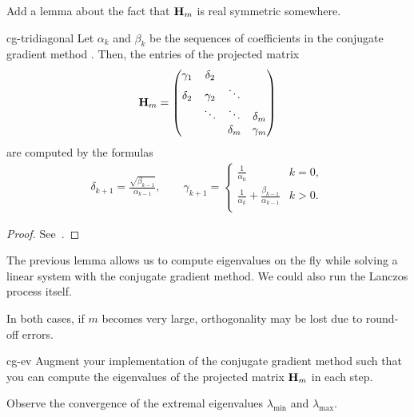 \begin{todo}
  Add a lemma about the fact that $\mathbf H_m$ is real symmetric somewhere.
\end{todo}

\begin{Lemma}{cg-tridiagonal}
  Let $\alpha_k$ and $\beta_k$ be the sequences of coefficients in the conjugate gradient method
  . Then, the entries of the projected matrix
  \begin{gather}
    \mathbf H_m =
    \begin{pmatrix}
            \gamma_1 & \delta_2\\
      \delta_2 & \gamma_2 & \ddots\\
      &\ddots&\ddots&\delta_m\\
      &&\delta_{m}&\gamma_m
    \end{pmatrix}
  \end{gather}
  are computed by the formulas
  \begin{gather}
    \delta_{k+1} = \frac{\sqrt{\beta_{k-1}}}{\alpha_{k-1}},
    \qquad
    \gamma_{k+1} =
    \begin{cases}
      \tfrac1{\alpha_0}&k=0,\\
      \tfrac1{\alpha_k} + \tfrac{\beta_{k-1}}{\alpha_{k-1}} &k>0.\\
    \end{cases}
  \end{gather}
\end{Lemma}

\begin{proof}
  See~\cite[Section 6.7.3]{Saad00}.
\end{proof}

\begin{remark}
  The previous lemma allows us to compute eigenvalues on the fly while
  solving a linear system with the conjugate gradient method. We could
  also run the Lanczos process  itself.

  In both cases, if $m$ becomes very large, orthogonality may be lost
  due to round-off errors.
\end{remark}

\begin{Problem}{cg-ev}
  Augment your implementation of the conjugate gradient method such
  that you can compute the eigenvalues of the projected matrix
  $\mathbf H_m$ in each step.

  Observe the convergence of the extremal eigenvalues $\lambda_{\text{min}}$
  and $\lambda_{\text{max}}$.
\end{Problem}


